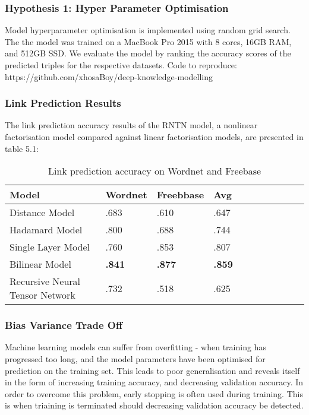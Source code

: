 \subsubsection{Hypothesis 1: Hyper Parameter Optimisation}
Model hyperparameter optimisation is implemented using random grid search. The the model was trained on a MacBook Pro 2015 with 8 cores, 16GB RAM, and 512GB SSD. \newline
We evaluate the model by ranking the accuracy scores of the predicted triples for the respective datasets. Code to reproduce: https://github.com/xhosaBoy/deep-knowledge-modelling

\subsubsection{Link Prediction Results}
The link prediction accuracy results of the RNTN model, a nonlinear factorisation model compared against linear factorisation models, are presented in table 5.1:

\begin{table}[H]
\caption{Link prediction accuracy on Wordnet and Freebase}
\centering
\begin{tabular}{lllllllllll}
  \textbf{Model} & \textbf{Wordnet} & \textbf{Freebbase} & \textbf{Avg} \\
  \hline
  Distance Model & .683 & .610 & .647 \\
  Hadamard Model & .800 & .688 & .744 \\
  Single Layer Model & .760 & .853 & .807 \\
  Bilinear Model & \textbf{.841} & \textbf{.877} & \textbf{.859} \\
  Recursive Neural Tensor Network & .732 & .518 & .625 \\

\end{tabular}
\end{table}

\subsubsection{Bias Variance Trade Off}
Machine learning models can suffer from overfitting \cite{reference} - when training has progressed too long, and the model parameters have been optimised for prediction on the training set. This leads to poor generalisation  and reveals itself in the form of increasing training accuracy, and decreasing validation accuracy. In order to overcome this problem, early stopping is often used during training. This is when triaining is terminated should decreasing validation accuracy be detected.\newline

